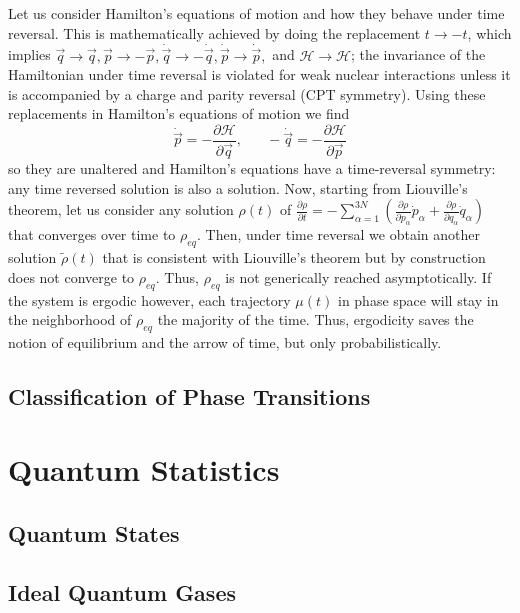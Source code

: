 \documentclass[12pt, a4paper, oneside, openright, titlepage]{book}
\begin{document}
Let us consider Hamilton's equations of motion and how they behave under time reversal. This is mathematically achieved by doing the replacement $t\rightarrow -t$, which implies $\vec{q}\rightarrow \vec{q},\vec{p}\rightarrow -\vec{p},\dot{\vec{q}}\rightarrow -\dot{\vec{q}},\dot{\vec{p}} \rightarrow \dot{\vec{p}},$ and $\mathcal{H}\rightarrow \mathcal{H}$; the invariance of the Hamiltonian under time reversal is violated for weak nuclear interactions unless it is accompanied by a charge and parity reversal (CPT symmetry). Using these replacements in Hamilton's equations of motion we find \begin{equation*}
    \dot{\vec{p}} = -\frac{\partial \mathcal{H}}{\partial \vec{q}},\;\;\;\;\;\;-\dot{\vec{q}} = -\frac{\partial \mathcal{H}}{\partial \vec{p}}
\end{equation*}
so they are unaltered and Hamilton's equations have a time-reversal symmetry: any time reversed solution is also a solution. Now, starting from Liouville's theorem, let us consider any solution $\rho(t)$ of $\frac{\partial \rho}{\partial t} = -\sum_{\alpha=1}^{3N}\left(\frac{\partial \rho}{\partial p_{\alpha}}\dot{p}_{\alpha} + \frac{\partial \rho}{\partial q_{\alpha}}\dot{q}_{\alpha}\right)$ that converges over time to $\rho_{eq}$. Then, under time reversal we obtain another solution $\tilde{\rho}(t)$ that is consistent with Liouville's theorem but by construction does not converge to $\rho_{eq}$. Thus, $\rho_{eq}$ is not generically reached asymptotically. If the system is ergodic however, each trajectory $\mu(t)$ in phase space will stay in the neighborhood of $\rho_{eq}$ the majority of the time. Thus, ergodicity saves the notion of equilibrium and the arrow of time, but only probabilistically.



\chapter{Classification of Phase Transitions}






\part{Quantum Statistics}


\chapter{Quantum States}


\chapter{Ideal Quantum Gases}








\begin{appendices}


\end{appendices}
\end{document}
